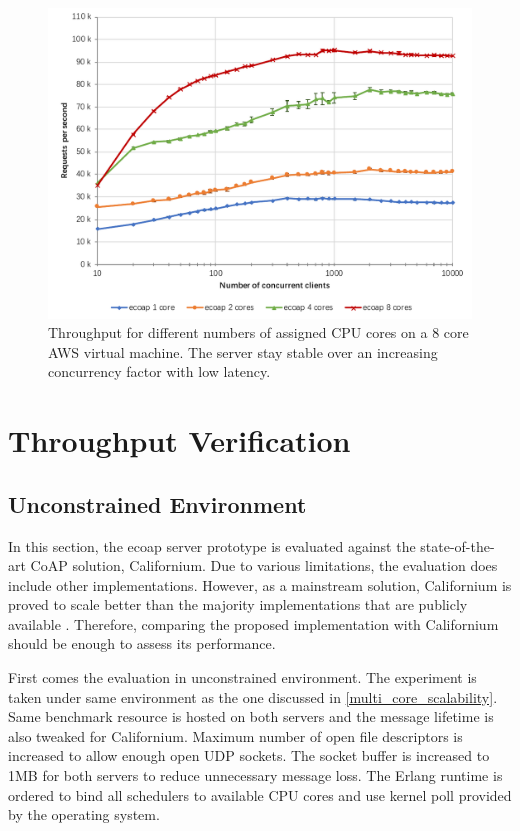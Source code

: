 \begin{figure}[!htbp]
\centering
\includegraphics[scale = 0.8]{vertical_scalability}
\caption{Throughput for different numbers of assigned CPU cores on a 8 core AWS virtual machine. The server stay stable over an increasing concurrency factor with low latency.}
\label{fig:scalability}
\end{figure}

\section{Throughput Verification}

\subsection{Unconstrained Environment}

In this section, the ecoap server prototype is evaluated against the state-of-the-art CoAP solution, Californium. Due to various limitations, the evaluation does include other implementations. However, as a mainstream solution, Californium is proved to scale better than the majority implementations that are publicly available \cite{lanter2013scalability} \cite{kovatsch2014californium} \cite{kovatsch2015scalable}. Therefore, comparing the proposed implementation with Californium should be enough to assess its performance. 

First comes the evaluation in unconstrained environment. The experiment is taken under same environment as the one discussed in \ref{multi_core_scalability}. Same benchmark resource is hosted on both servers and the message lifetime is also tweaked for Californium. Maximum number of open file descriptors is increased to allow enough open UDP sockets. The socket buffer is increased to 1MB for both servers to reduce unnecessary message loss. The Erlang runtime is ordered to bind all schedulers to available CPU cores and use kernel poll provided by the operating system. 

